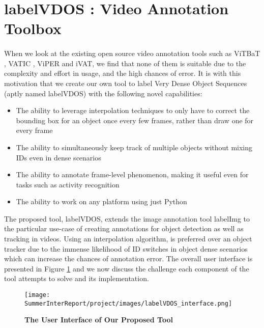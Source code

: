 \section{labelVDOS : Video Annotation Toolbox}

\paragraph{}
When we look at the existing open source video annotation tools such as ViTBaT \cite{biresaw2016vitbat}, VATIC \cite{vondrick2013efficiently}, ViPER \cite{doermann2000tools} and iVAT\cite{bianco2015interactive}, we find that none of them is suitable due to the complexity and effort in usage, and the high chances of error. It is with this motivation that we create our own tool to label Very Dense Object Sequences (aptly named labelVDOS) with the following novel capabilities:
\begin{itemize}
    \item The ability to leverage interpolation techniques to only have to correct the bounding box for an object once every few frames, rather than draw one for every frame
    \item The ability to simultaneously keep track of multiple objects without mixing IDs even in dense scenarios
    \item The ability to annotate frame-level phenomenon, making it useful even for tasks such as activity recognition
    \item The ability to work on any platform using just Python
\end{itemize}

The proposed tool, labelVDOS, extends the image annotation tool labelImg\cite{LabelImg} to the particular use-case of creating annotations for object detection as well as tracking in videos. Using an interpolation algorithm, is preferred over an object tracker due to the immense likelihood of ID switches in object dense scenarios which can increase the chances of annotation error. The overall user interface is presented in Figure \ref{labelVDOSLayout} and we now discuss the challenge each component of the tool attempts to solve and its implementation.

\begin{figure}
\centering
{
\texttt{[image: SummerInterReport/project/images/labelVDOS\_interface.png]}
\vspace{-1cm}
\caption{\textbf{The User Interface of Our Proposed Tool}}
\label{labelVDOSLayout}
}
\end{figure}

